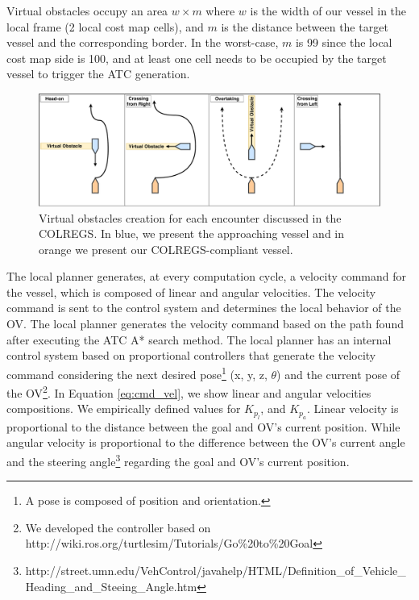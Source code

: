             Virtual obstacles occupy an area $w \times m$ where $w$ is the width of our vessel in the local frame (2 local cost map cells), and $m$ is the distance between the target vessel and the corresponding border. In the worst-case, $m$ is 99 since the local cost map side is 100, and at least one cell needs to be occupied by the target vessel to trigger the \ac{ATC} generation. 
            
            \begin{figure}[H]
                \centering
                \includegraphics[scale=0.32]{figs/Chap4/atc.pdf}
                \caption{Virtual obstacles creation for each encounter discussed in the \ac{COLREGS}. In blue, we present the approaching vessel and in orange we present our \ac{COLREGS}-compliant vessel.
                }
                \label{fig:atc}
            \end{figure}

            The local planner generates, at every computation cycle, a velocity command for the vessel, which is composed of linear and angular velocities. The velocity command is sent to the control system and determines the local behavior of the \ac{OV}. The local planner generates the velocity command based on the path found after executing the \ac{ATC} A* search method. The local planner has an internal control system based on proportional controllers that generate the velocity command considering the next desired pose\footnote{A pose is composed of position and orientation.} (x, y, z, $\theta$) and the current pose of the \ac{OV}\footnote{We developed the controller based on http://wiki.ros.org/turtlesim/Tutorials/Go\%20to\%20Goal}. In Equation \ref{eq:cmd_vel}, we show linear and angular velocities compositions. We empirically defined values for $K_{p_{l}}$, and $K_{p_{a}}$. Linear velocity is proportional to the distance between the goal and \ac{OV}'s current position. While angular velocity is proportional to the difference between the \ac{OV}'s current angle and the steering angle\footnote{http://street.umn.edu/VehControl/javahelp/HTML/Definition\_of\_Vehicle\_Heading\_and\_Steeing\_Angle.htm} regarding the goal and \ac{OV}'s current position.
            
